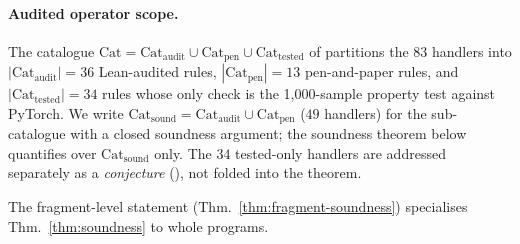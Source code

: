 \paragraph{Audited operator scope.} The catalogue
$\mathrm{Cat}=\mathrm{Cat}_{\mathrm{audit}}\cup\mathrm{Cat}_{\mathrm{pen}}\cup\mathrm{Cat}_{\mathrm{tested}}$
of  partitions the $83$ handlers into
$|\mathrm{Cat}_{\mathrm{audit}}|=36$ Lean-audited rules,
$|\mathrm{Cat}_{\mathrm{pen}}|=13$ pen-and-paper rules, and
$|\mathrm{Cat}_{\mathrm{tested}}|=34$ rules whose only check is the
1{,}000-sample property test against PyTorch. We write
$\mathrm{Cat}_{\mathrm{sound}}=\mathrm{Cat}_{\mathrm{audit}}\cup\mathrm{Cat}_{\mathrm{pen}}$
($49$ handlers) for the sub-catalogue with a closed soundness
argument; the soundness theorem below quantifies over
$\mathrm{Cat}_{\mathrm{sound}}$ only. The $34$ tested-only handlers
are addressed separately as a \emph{conjecture}
(), not folded into the theorem.



\noindent The fragment-level statement (Thm.~\ref{thm:fragment-soundness})
specialises Thm.~\ref{thm:soundness} to whole programs.

